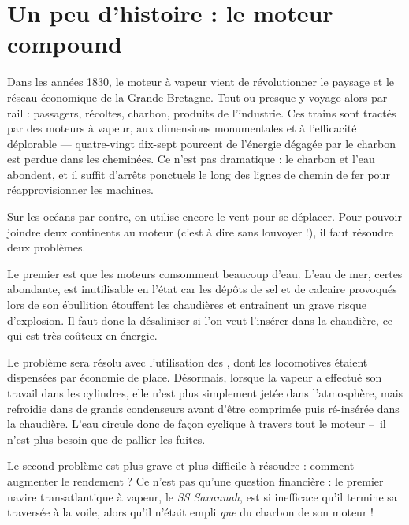 \atstartofhistorysection
\section[Un peu d’histoire : le moteur compound]{Un peu d’histoire :\onlyamphibook{\\} le moteur compound}
\label{ch_histoire_compound}

	Dans les années 1830, le moteur à vapeur vient de révolutionner le paysage et le réseau économique de la Grande-Bretagne. Tout ou presque y voyage alors par rail : passagers, récoltes, charbon, produits de l’industrie. Ces trains sont tractés par des moteurs à vapeur, aux dimensions monumentales et à l’efficacité déplorable — quatre-vingt dix-sept pourcent de l’énergie dégagée par le charbon est perdue dans les cheminées. Ce n’est pas dramatique : le charbon et l’eau abondent, et il suffit d’arrêts ponctuels le long des lignes de chemin de fer pour réapprovisionner les machines.

	Sur les océans par contre, on utilise encore le vent pour se déplacer. Pour pouvoir joindre deux continents au moteur (c’est à dire sans louvoyer !), il faut résoudre deux problèmes.

	Le premier est que les moteurs consomment beaucoup d’eau. L’eau de mer, certes abondante, est inutilisable en l’état car les dépôts de sel et de calcaire provoqués lors de son ébullition étouffent les chaudières et entraînent un grave risque d’explosion. Il faut donc la désaliniser si l’on veut l’insérer dans la chaudière, ce qui est très coûteux en énergie.

	Le problème sera résolu avec l’utilisation des , dont les locomotives étaient dispensées par économie de place. Désormais, lorsque la vapeur a effectué son travail dans les cylindres, elle n’est plus simplement jetée dans l’atmosphère, mais refroidie dans de grands condenseurs avant d’être comprimée puis ré-insérée dans la chaudière. L’eau circule donc de façon cyclique à travers tout le moteur --\ il n’est plus besoin que de pallier les fuites.

	Le second problème est plus grave et plus difficile à résoudre : comment augmenter le rendement ? Ce n’est pas qu’une question financière : le premier navire transatlantique à vapeur, le \textit{SS Savannah}, est si inefficace qu’il termine sa traversée à la voile, alors qu’il n’était empli \emph{que} du charbon de son moteur !

